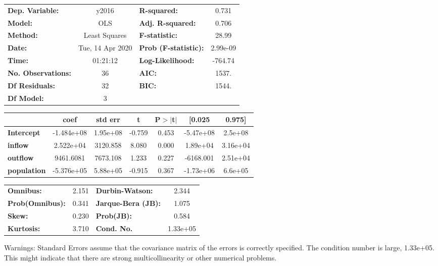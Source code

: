 \begin{center}
\begin{tabular}{lclc}
\toprule
\textbf{Dep. Variable:}    &      y2016       & \textbf{  R-squared:         } &     0.731   \\
\textbf{Model:}            &       OLS        & \textbf{  Adj. R-squared:    } &     0.706   \\
\textbf{Method:}           &  Least Squares   & \textbf{  F-statistic:       } &     28.99   \\
\textbf{Date:}             & Tue, 14 Apr 2020 & \textbf{  Prob (F-statistic):} &  2.99e-09   \\
\textbf{Time:}             &     01:21:12     & \textbf{  Log-Likelihood:    } &   -764.74   \\
\textbf{No. Observations:} &          36      & \textbf{  AIC:               } &     1537.   \\
\textbf{Df Residuals:}     &          32      & \textbf{  BIC:               } &     1544.   \\
\textbf{Df Model:}         &           3      & \textbf{                     } &             \\
\bottomrule
\end{tabular}
\begin{tabular}{lcccccc}
                    & \textbf{coef} & \textbf{std err} & \textbf{t} & \textbf{P$> |$t$|$} & \textbf{[0.025} & \textbf{0.975]}  \\
\midrule
\textbf{Intercept}  &   -1.484e+08  &     1.95e+08     &    -0.759  &         0.453        &    -5.47e+08    &      2.5e+08     \\
\textbf{inflow}     &    2.522e+04  &     3120.858     &     8.080  &         0.000        &     1.89e+04    &     3.16e+04     \\
\textbf{outflow}    &    9461.6081  &     7673.108     &     1.233  &         0.227        &    -6168.001    &     2.51e+04     \\
\textbf{population} &   -5.376e+05  &     5.88e+05     &    -0.915  &         0.367        &    -1.73e+06    &      6.6e+05     \\
\bottomrule
\end{tabular}
\begin{tabular}{lclc}
\textbf{Omnibus:}       &  2.151 & \textbf{  Durbin-Watson:     } &    2.344  \\
\textbf{Prob(Omnibus):} &  0.341 & \textbf{  Jarque-Bera (JB):  } &    1.075  \\
\textbf{Skew:}          &  0.230 & \textbf{  Prob(JB):          } &    0.584  \\
\textbf{Kurtosis:}      &  3.710 & \textbf{  Cond. No.          } & 1.33e+05  \\
\bottomrule
\end{tabular}
\end{center}

Warnings: \newline
 [1] Standard Errors assume that the covariance matrix of the errors is correctly specified. \newline
 [2] The condition number is large, 1.33e+05. This might indicate that there are \newline
 strong multicollinearity or other numerical problems.